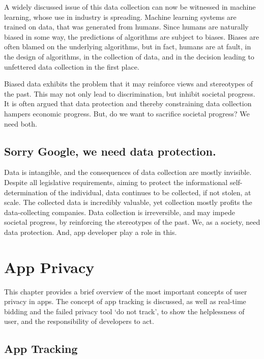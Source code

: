 \documentclass[
]{book}
\begin{document}
A widely discussed issue of this data collection can now be witnessed in machine learning, whose use in industry is spreading. Machine learning systems are trained on data, that was generated from humans. Since humans are naturally biased in some way, the predictions of algorithms are subject to biases. Biases are often blamed on the underlying algorithms, but in fact, humans are at fault, in the design of algorithms, in the collection of data, and in the decision leading to unfettered data collection in the first place.

Biased data exhibits the problem that it may reinforce views and stereotypes of the past. This may not only lead to discrimination, but inhibit societal progress. It is often argued that data protection and thereby constraining data collection hampers economic progress. But, do we want to sacrifice societal progress? We need both.

\hypertarget{sorry-google-we-need-data-protection.}{%
\section{Sorry Google, we need data protection.}\label{sorry-google-we-need-data-protection.}}

Data is intangible, and the consequences of data collection are mostly invisible. Despite all legislative requirements, aiming to protect the informational self-determination of the individual, data continues to be collected, if not stolen, at scale. The collected data is incredibly valuable, yet collection mostly profits the data-collecting companies. Data collection is irreversible, and may impede societal progress, by reinforcing the stereotypes of the past. We, as a society, need data protection. And, app developer play a role in this.

\hypertarget{app-privacy}{%
\chapter{App Privacy}\label{app-privacy}}

This chapter provides a brief overview of the most important concepts of user privacy in apps. The concept of app tracking is discussed, as well as real-time bidding and the failed privacy tool `do not track', to show the helplessness of user, and the responsibility of developers to act.

\hypertarget{app-tracking}{%
\section{App Tracking}\label{app-tracking}}
\end{document}
